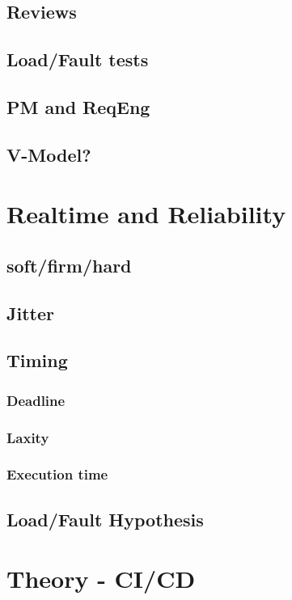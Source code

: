 \documentclass[master,english,smartquotes,apa]{hgbthesis}
\begin{document}
	\subsection{Reviews}
	
	\subsection{Load/Fault tests}
	
	\subsection{PM and ReqEng}
	
	\subsection{V-Model?}

	\section{Realtime and Reliability}
	\subsection{soft/firm/hard}
	\subsection{Jitter}
	\subsection{Timing}
	\subsubsection{Deadline}
	\subsubsection{Laxity}
	\subsubsection{Execution time}
	\subsection{Load/Fault Hypothesis}

	\section{Theory - CI/CD}
\end{document}
